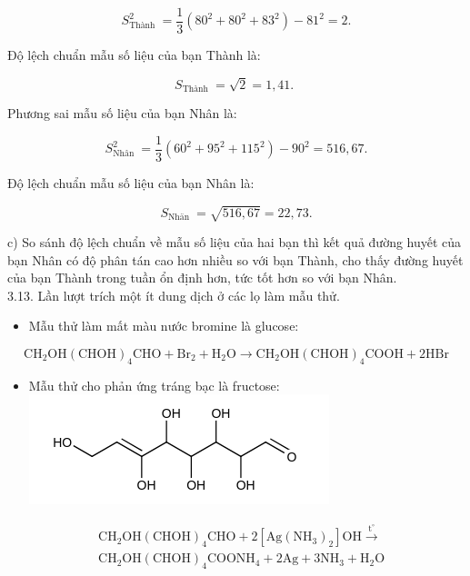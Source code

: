 \documentclass[10pt]{article}
\begin{document}
$$
S_{\text {Thành }}^{2}=\frac{1}{3}\left(80^{2}+80^{2}+83^{2}\right)-81^{2}=2 .
$$

Độ lệch chuẩn mẫu số liệu của bạn Thành là:

$$
S_{\text {Thành }}=\sqrt{2}=1,41 \text {. }
$$

Phương sai mẫu số liệu của bạn Nhân là:

$$
S_{\text {Nhân }}^{2}=\frac{1}{3}\left(60^{2}+95^{2}+115^{2}\right)-90^{2}=516,67 .
$$

Độ lệch chuẩn mẫu số liệu của bạn Nhân là:

$$
S_{\text {Nhän }}=\sqrt{516,67}=22,73 .
$$

c) So sánh độ lệch chuẩn về mẫu số liệu của hai bạn thì kết quả đường huyết của bạn Nhân có độ phân tán cao hơn nhiều so với bạn Thành, cho thấy đường huyết của bạn Thành trong tuần ổn định hơn, tức tốt hơn so với bạn Nhân.\\
3.13. Lần lượt trích một ít dung dịch ở các lọ làm mẫu thử.

\begin{itemize}
  \item Mẫu thử làm mất màu nước bromine là glucose:
\end{itemize}

$$
\mathrm{CH}_{2} \mathrm{OH}(\mathrm{CHOH})_{4} \mathrm{CHO}+\mathrm{Br}_{2}+\mathrm{H}_{2} \mathrm{O} \longrightarrow \mathrm{CH}_{2} \mathrm{OH}(\mathrm{CHOH})_{4} \mathrm{COOH}+2 \mathrm{HBr}
$$

\begin{itemize}
  \item Mẫu thử cho phản ứng tráng bạc là fructose:\\
\includegraphics{smile-effaf37220136a48aae70f6025575b87cb7c37db}
\end{itemize}

$$
\begin{aligned}
& \mathrm{CH}_{2} \mathrm{OH}(\mathrm{CHOH})_{4} \mathrm{CHO}+2\left[\mathrm{Ag}\left(\mathrm{NH}_{3}\right)_{2}\right] \mathrm{OH} \xrightarrow{\mathrm{t}^{\circ}} \\
& \mathrm{CH}_{2} \mathrm{OH}(\mathrm{CHOH})_{4} \mathrm{COONH}_{4}+2 \mathrm{Ag}+3 \mathrm{NH}_{3}+\mathrm{H}_{2} \mathrm{O}
\end{aligned}
$$
\end{document}
